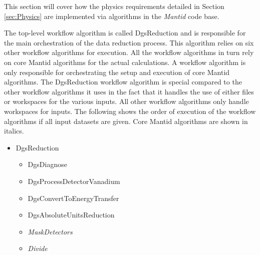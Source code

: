 This section will cover how the physics requirements detailed in Section \ref{sec:Physics} are implemented via algorithms in the \textit{Mantid} code base.

The top-level workflow algorithm is called DgsReduction and is responsible for the main orchestration of the data reduction process. This algorithm relies on six other workflow algorithms for execution. All the workflow algorithms in turn rely on core Mantid algorithms for the actual calculations. A workflow algorithm is only responsible for orchestrating the setup and execution of core Mantid algorithms. The DgsReduction workflow algorithm is special compared to the other workflow algorithms it uses in the fact that it handles the use of either files or workspaces for the various inputs. All other workflow algorithms only handle workspaces for inputs. The following shows the order of execution of the workflow algorithms if all input datasets are given. Core Mantid algorithms are shown in italics.
\begin{itemize}
\item DgsReduction
\begin{itemize}
\item DgsDiagnose
\item DgsProcessDetectorVanadium
\item DgsConvertToEnergyTransfer
\item DgsAbsoluteUnitsReduction
\item \textit{MaskDetectors}
\item \textit{Divide}
\end{itemize}
\end{itemize}
